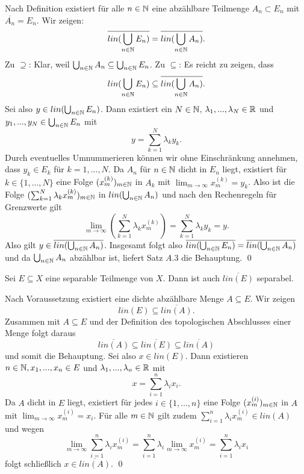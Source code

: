 \begin{proof*}
    Nach Definition existiert für alle $n \in \mathbb{N}$ eine abzählbare Teilmenge $A_n \subset E_n$ mit $\overline{A_n} = E_n$. Wir zeigen: 
    $$
    \overline{lin(\bigcup_{n \in \mathbb{N}}E_n)} = \overline{lin(\bigcup_{n \in \mathbb{N}}A_n)}. 
    $$
    Zu $\supseteq$: Klar, weil $\bigcup_{n \in \mathbb{N}}A_n \subseteq \bigcup_{n \in \mathbb{N}}E_n$. \newline 
    Zu $\subseteq$: Es reicht zu zeigen, dass
    $$
        lin(\bigcup_{n \in \mathbb{N}}E_n) \subseteq \overline{lin(\bigcup_{n \in \mathbb{N}}A_n)}.
    $$
    Sei also $y \in lin(\bigcup_{n \in \mathbb{N}}E_n)$. Dann existiert ein $N \in \mathbb{N}$, $\lambda_1,...,\lambda_N \in \mathbb{R}$ und $y_1,...,y_N \in \bigcup_{n \in \mathbb{N}}E_n$ mit 
    $$
        y = \sum_{k=1}^N\lambda_ky_k. 
    $$
    Durch eventuelles Umnummerieren können wir ohne Einschränkung annehmen, dass $y_k \in E_k$ für $k=1,...,N$. 
    Da $A_n$ für $n \in \mathbb{N}$ dicht in $E_n$ liegt, existiert für $k \in \{1,...,N\}$ eine Folge $(x_m^{(k)})_{m \in \mathbb{N}}$ in $A_k$ mit $\lim_{m \to \infty}x_m^{(k)} = y_k$. 
    Also ist die Folge $(\sum_{k=1}^N\lambda_k x_m^{(k)})_{m \in \mathbb{N}}$ in $lin(\bigcup_{n \in \mathbb{N}}A_n)$ und nach den Rechenregeln für Grenzwerte gilt 
    $$
        \lim_{m \to \infty}\left(\sum_{k=1}^N\lambda_k x_m^{(k)}\right) = \sum_{k=1}^N\lambda_ky_k = y. 
    $$
    Also gilt $y \in \overline{lin(\bigcup_{n \in \mathbb{N}}A_n)}$. 
    Insgesamt folgt also $\overline{lin(\bigcup_{n \in \mathbb{N}}E_n)} = \overline{lin(\bigcup_{n \in \mathbb{N}}A_n)}$ und da $\bigcup_{n \in \mathbb{N}}A_n$ abzählbar ist, liefert Satz $A.3$ die Behauptung. \qed
\end{proof*}

\begin{corollary}
    Sei $E \subseteq X$ eine separable Teilmenge von $X$. Dann ist auch $\overline{lin(E)}$ separabel. 
\end{corollary}
\begin{proof*}
    Nach Voraussetzung existiert eine dichte abzählbare Menge $A \subseteq E$. Wir zeigen 
    $$
        lin(E) \subseteq \overline{lin(A)}. 
    $$
    Zusammen mit $A \subseteq E$ und der Definition des topologischen Abschlusses einer Menge folgt daraus
    $$
        \overline{lin(A)} \subseteq \overline{lin(E)} \subseteq \overline{lin(A)}
    $$
    und somit die Behauptung. Sei also $x \in lin(E)$. Dann existieren $n \in \mathbb{N}, x_1,...,x_n \in E$ und $\lambda_1,...,\lambda_n \in \mathbb{R}$ mit
    $$
        x = \sum_{i=1}^n \lambda_i x_i. 
    $$ 
    Da $A$ dicht in $E$ liegt, existiert für jedes $i \in \{1,...,n\}$ eine Folge $(x_m^{(i)})_{m \in \mathbb{N}}$ in $A$ mit \mbox{$\lim_{m \to \infty}x_m^{(i)} = x_i$.}
    Für alle $m \in \mathbb{N}$ gilt zudem $\sum_{i=1}^n \lambda_i x_m^{(i)} \in lin(A)$ und wegen 
    $$
        \lim_{m \to \infty} \sum_{i=1}^n \lambda_i x_m^{(i)} = \sum_{i=1}^n \lambda_i \lim_{m \to \infty}x_m^{(i)} = \sum_{i=1}^n \lambda_i x_i
    $$
    folgt schließlich $x \in \overline{lin(A)}$. \qed 
\end{proof*}

